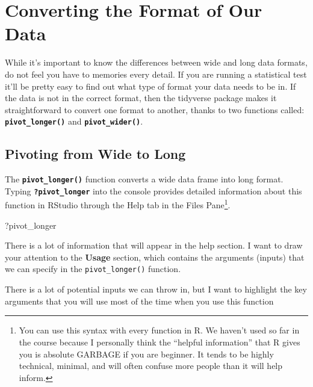 \documentclass[
]{book}
\newenvironment{Shaded}{\begin{snugshade}}{\end{snugshade}}
\newcommand{\NormalTok}[1]{#1}
\begin{document}
\hypertarget{converting-the-format-of-our-data}{%
\section{Converting the Format of Our Data}\label{converting-the-format-of-our-data}}

While it's important to know the differences between wide and long data formats, do not feel you have to memories every detail. If you are running a statistical test it'll be pretty easy to find out what type of format your data needs to be in. If the data is not in the correct format, then the tidyverse package makes it straightforward to convert one format to another, thanks to two functions called: \textbf{\texttt{pivot\_longer()}} and \textbf{\texttt{pivot\_wider()}}.

\hypertarget{pivoting-from-wide-to-long}{%
\subsection{Pivoting from Wide to Long}\label{pivoting-from-wide-to-long}}

The \textbf{\texttt{pivot\_longer()}} function converts a wide data frame into long format. Typing \textbf{\texttt{?pivot\_longer}} into the console provides detailed information about this function in RStudio through the Help tab in the Files Pane\footnote{You can use this syntax with every function in R. We haven't used so far in the course because I personally think the ``helpful information'' that R gives you is absolute GARBAGE if you are beginner. It tends to be highly technical, minimal, and will often confuse more people than it will help inform.}.

\begin{Shaded}
\begin{Highlighting}[]
\NormalTok{?pivot\_longer}
\end{Highlighting}
\end{Shaded}

There is a lot of information that will appear in the help section. I want to draw your attention to the \textbf{Usage} section, which contains the arguments (inputs) that we can specify in the \texttt{pivot\_longer()} function.

There is a lot of potential inputs we can throw in, but I want to highlight the key arguments that you will use most of the time when you use this function
\end{document}

